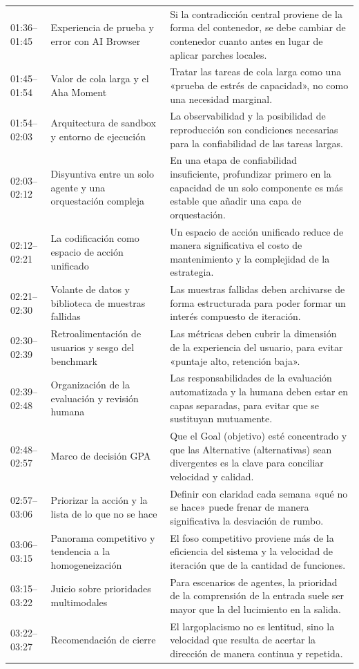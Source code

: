 \documentclass[a4paper]{article}
\begin{document}
\begin{longtable}{p{2.6cm}p{4.0cm}p{6.6cm}}
01:36--01:45 & Experiencia de prueba y error con AI Browser & Si la contradicción central proviene de la forma del contenedor, se debe cambiar de contenedor cuanto antes en lugar de aplicar parches locales. \\
01:45--01:54 & Valor de cola larga y el Aha Moment & Tratar las tareas de cola larga como una «prueba de estrés de capacidad», no como una necesidad marginal. \\
01:54--02:03 & Arquitectura de sandbox y entorno de ejecución & La observabilidad y la posibilidad de reproducción son condiciones necesarias para la confiabilidad de las tareas largas. \\
02:03--02:12 & Disyuntiva entre un solo agente y una orquestación compleja & En una etapa de confiabilidad insuficiente, profundizar primero en la capacidad de un solo componente es más estable que añadir una capa de orquestación. \\
02:12--02:21 & La codificación como espacio de acción unificado & Un espacio de acción unificado reduce de manera significativa el costo de mantenimiento y la complejidad de la estrategia. \\
02:21--02:30 & Volante de datos y biblioteca de muestras fallidas & Las muestras fallidas deben archivarse de forma estructurada para poder formar un interés compuesto de iteración. \\
02:30--02:39 & Retroalimentación de usuarios y sesgo del benchmark & Las métricas deben cubrir la dimensión de la experiencia del usuario, para evitar «puntaje alto, retención baja». \\
02:39--02:48 & Organización de la evaluación y revisión humana & Las responsabilidades de la evaluación automatizada y la humana deben estar en capas separadas, para evitar que se sustituyan mutuamente. \\
02:48--02:57 & Marco de decisión GPA & Que el Goal (objetivo) esté concentrado y que las Alternative (alternativas) sean divergentes es la clave para conciliar velocidad y calidad. \\
02:57--03:06 & Priorizar la acción y la lista de lo que no se hace & Definir con claridad cada semana «qué no se hace» puede frenar de manera significativa la desviación de rumbo. \\
03:06--03:15 & Panorama competitivo y tendencia a la homogeneización & El foso competitivo proviene más de la eficiencia del sistema y la velocidad de iteración que de la cantidad de funciones. \\
03:15--03:22 & Juicio sobre prioridades multimodales & Para escenarios de agentes, la prioridad de la comprensión de la entrada suele ser mayor que la del lucimiento en la salida. \\
03:22--03:27 & Recomendación de cierre & El largoplacismo no es lentitud, sino la velocidad que resulta de acertar la dirección de manera continua y repetida. \\
\bottomrule
\end{longtable}
\end{document}
